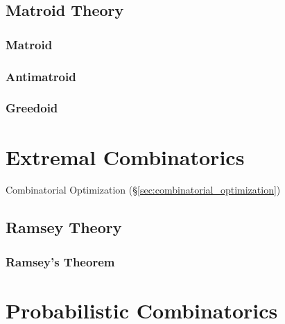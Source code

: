 \subsection{Matroid Theory}\label{sec:matroid_theory}

\subsubsection{Matroid}\label{sec:matroid}

\subsubsection{Antimatroid}\label{sec:antimatroid}

\subsubsection{Greedoid}\label{sec:greedoid}



\section{Extremal Combinatorics}\label{sec:extremal_combinatorics}

Combinatorial Optimization (\S\ref{sec:combinatorial_optimization})



\subsection{Ramsey Theory}\label{sec:ramsey_theory}

\subsubsection{Ramsey's Theorem}\label{sec:ramseys_theorem}



\section{Probabilistic Combinatorics}\label{sec:probabilistic_combinatorics}

